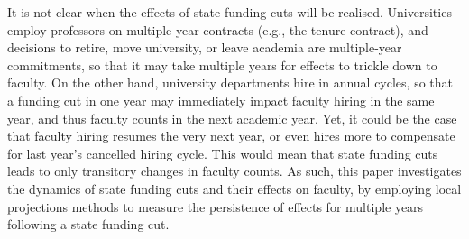It is not clear when the effects of state funding cuts will be realised.
Universities employ professors on multiple-year contracts (e.g., the tenure contract), and decisions to retire, move university, or leave academia are multiple-year commitments, so that it may take multiple years for effects to trickle down to faculty.
On the other hand, university departments hire in annual cycles, so that a funding cut in one year may immediately impact faculty hiring in the same year, and thus faculty counts in the next academic year.
Yet, it could be the case that faculty hiring resumes the very next year, or even hires more to compensate for last year's cancelled hiring cycle.
This would mean that state funding cuts leads to only transitory changes in faculty counts.
As such, this paper investigates the dynamics of state funding cuts and their effects on faculty, by employing local projections methods to measure the persistence of effects for multiple years following a state funding cut.
